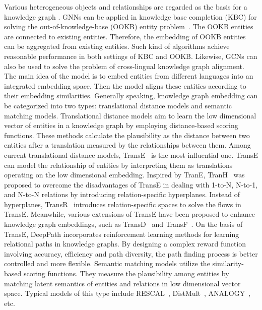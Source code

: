 Various heterogeneous objects and relationships are regarded as the basis for a knowledge graph . GNNs can be applied in knowledge base completion (KBC) for solving the out-of-knowledge-base (OOKB) entity problem~. The OOKB entities are connected to  existing entities. Therefore, the embedding of OOKB entities can be aggregated from existing entities. Such kind of algorithms achieve reasonable performance in both settings of KBC and OOKB. Likewise, GCNs can also be used to solve the problem of cross-lingual knowledge graph alignment. The main idea of the model is to embed entities from different languages into an integrated embedding space. Then the model aligns these entities according to their embedding similarities.
Generally speaking, knowledge graph embedding can be categorized into two types: translational distance models and semantic matching models. Translational distance models aim to learn the low dimensional vector of entities in a knowledge graph by employing distance-based scoring functions. These methods calculate the plausibility as the distance between two entities after a translation measured by the relationships between them. Among current translational distance models, TransE~ is the most influential one. TransE can model the relationship of entities by interpreting them as translations operating on the low dimensional embedding. Inspired by TranE, TranH~ was proposed to overcome the disadvantages of TransE in dealing with 1-to-N, N-to-1, and N-to-N relations by introducing relation-specific hyperplanes. Instead of hyperplanes, TransR~ introduces relation-specific spaces to solve the flows in TransE. Meanwhile, various extensions of TransE have been proposed to enhance knowledge graph embeddings, such as TransD~ and TransF~. On the basis of TransE, DeepPath  incorporates reinforcement learning methods for learning relational paths in knowledge graphs. By designing a complex reward function involving accuracy, efficiency and path diversity, the path finding process is better controlled and more flexible.
Semantic matching models utilize the similarity-based scoring functions. They measure the plausibility among entities by matching latent semantics of entities and relations in low dimensional vector space. Typical models of this type include RESCAL~, DistMult~, ANALOGY~, etc.

